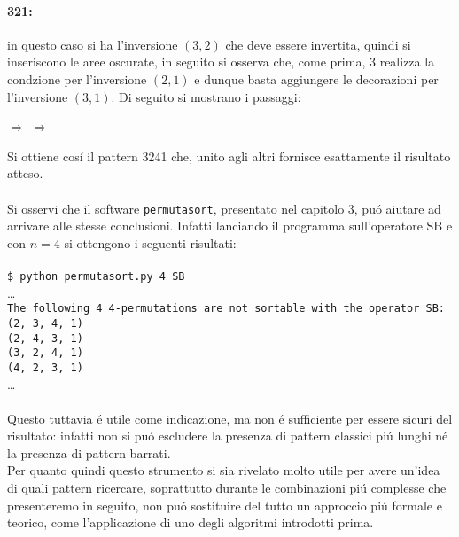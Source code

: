 \paragraph*{321:} in questo caso si ha l'inversione $(3,2)$ che deve essere invertita, quindi si inseriscono le aree oscurate, in seguito si osserva che, come prima, $3$ realizza la condzione per l'inversione $(2,1)$ e dunque basta aggiungere le decorazioni per l'inversione $(3,1)$. Di seguito si mostrano i passaggi:
\begin{center}
$\Rightarrow$
$\Rightarrow$
\\
\end{center}
Si ottiene cos\'i il pattern 3241 che, unito agli altri fornisce esattamente il risultato atteso.\\\\
Si osservi che il software \texttt{permutasort}, presentato nel capitolo 3, pu\'o aiutare ad arrivare alle stesse conclusioni. Infatti lanciando il programma sull'operatore SB e con $n=4$ si ottengono i seguenti risultati:\\\\\texttt{\$ python permutasort.py 4 SB }\\\dots\\\texttt{The following 4 4-permutations are not sortable with the operator SB:}\\\texttt{(2, 3, 4, 1)}\\\texttt{(2, 4, 3, 1)}\\\texttt{(3, 2, 4, 1)}\\\texttt{(4, 2, 3, 1)}\\\dots\\\\
Questo tuttavia \'e utile come indicazione, ma non \'e sufficiente per essere sicuri del risultato: infatti non si pu\'o escludere la presenza di pattern classici pi\'u lunghi n\'e la presenza di pattern barrati.\\
Per quanto quindi questo strumento si sia rivelato molto utile per avere un'idea di quali pattern ricercare, soprattutto durante le combinazioni pi\'u complesse che presenteremo in seguito, non pu\'o sostituire del tutto un approccio pi\'u formale e teorico, come l'applicazione di uno degli algoritmi introdotti prima.
